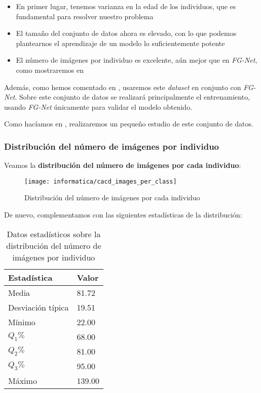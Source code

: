 \begin{itemize}
    \item En primer lugar, tenemos varianza en la edad de los individuos, que es fundamental para resolver nuestro problema
    \item El tamaño del conjunto de datos ahora es elevado, con lo que podemos plantearnos el aprendizaje de un modelo lo suficientemente potente
    \item El número de imágenes por individuo es excelente, aún mejor que en \textit{FG-Net}, como mostraremos en 
\end{itemize}

Además, como hemos comentado en , usaremos este \textit{dataset} en conjunto con \textit{FG-Net}. Sobre este conjunto de datos se realizará principalmente el entrenamiento, usando \textit{FG-Net} únicamente para validar el modelo obtenido.

Como hacíamos en , realizaremos un pequeño estudio de este conjunto de datos.

\subsubsection{Distribución del número de imágenes por individuo} \label{isubsubs:cacd_images_per_indv}

Veamos la \textbf{distribución del número de imágenes por cada individuo}:

\begin{figure}[H]
    \centering
    \texttt{[image: informatica/cacd\_images\_per\_class]}
    \caption{Distribución del número de imágenes por cada individuo}
    \label{img:cacd_distr_images_per_class}
\end{figure}

De nuevo, complementamos con las siguientes estadísticas de la distribución:

\begin{table}[H]
\centering
\begin{tabular}{|l|l|}
    \hline
    \textbf{Estadística} & \textbf{Valor} \\
    \hline

    Media             & 81.72  \\
    Desviación típica & 19.51  \\
    Mínimo            & 22.00  \\
    $Q_1 \%$          & 68.00  \\
    $Q_2 \%$          & 81.00  \\
    $Q_3 \%$          & 95.00  \\
    Máximo            & 139.00 \\
    \hline

\end{tabular}
\caption{Datos estadísticos sobre la distribución del número de imágenes por individuo}
\end{table}

